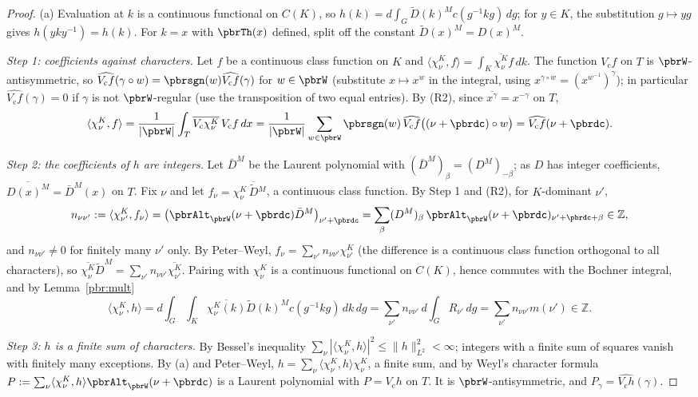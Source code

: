 \documentclass[10pt]{amsart}
\theoremstyle{definition}
\theoremstyle{remark}
\newcommand{\Z}{\mathbb Z}
\providecommand{\aubar}[1]{\overline{#1}}
\begin{document}
\begin{proof}
(a) Evaluation at $k$ is a continuous functional on $C(K)$, so $h(k)=d\int_G\widetilde D(k)^Mc(g^{-1}
kg)\,dg$; for $y\in K$, the substitution $g\mapsto yg$ gives $h(yky^{-1})=h(k)$. For $k=x$ with
$\pbrTh(x)$ defined, split off the constant $\widetilde D(x)^M=D(x)^M$.

\emph{Step 1: coefficients against characters.} Let $f$ be a continuous class function on $K$ and
$\langle\chi^K_\nu,f\rangle=\int_K\aubar{\chi^K_\nu}f\,dk$. The function $V_{\mathrm c}f$ on $T$ is
$\pbrW$-antisymmetric, so $\widehat{V_{\mathrm c}f}(\gamma\circ w)=\pbrsgn(w)\widehat{V_{\mathrm c}f}
(\gamma)$ for $w\in\pbrW$ (substitute $x\mapsto x^w$ in the integral, using
$x^{\gamma\circ w}=(x^{w^{-1}})^\gamma$); in particular $\widehat{V_{\mathrm c}f}(\gamma)=0$ if
$\gamma$ is not $\pbrW$-regular (use the transposition of two equal entries). By (R2), since
$\aubar{x^\gamma}=x^{-\gamma}$ on $T$,
\[
\langle\chi^K_\nu,f\rangle=\frac1{|\pbrW|}\int_T\aubar{V_{\mathrm c}\chi^K_\nu}\,V_{\mathrm c}f\,dx
=\frac1{|\pbrW|}\sum_{w\in\pbrW}\pbrsgn(w)\,\widehat{V_{\mathrm c}f}\bigl((\nu+\pbrdc)\circ w\bigr)
=\widehat{V_{\mathrm c}f}(\nu+\pbrdc).
\]

\emph{Step 2: the coefficients of $h$ are integers.} Let $\bar D^M$ be the Laurent polynomial with
$(\bar D^M)_\beta=(D^M)_{-\beta}$; as $D$ has integer coefficients, $\aubar{D(x)^M}=\bar D^M(x)$ on
$T$. Fix $\nu$ and let $f_\nu=\chi^K_\nu\,\aubar{\widetilde D}{}^M$, a continuous class function. By
Step 1 and (R2), for $K$-dominant $\nu'$,
\begin{equation}\label{pbr:eq-n}
n_{\nu\nu'}:=\langle\chi^K_{\nu'},f_\nu\rangle=\bigl(\pbrAlt_{\pbrW}(\nu+\pbrdc)\bar D^M\bigr)_{\nu'+
\pbrdc}=\sum_\beta(D^M)_\beta\,\pbrAlt_{\pbrW}(\nu+\pbrdc)_{\nu'+\pbrdc+\beta}\in\Z,
\end{equation}
and $n_{\nu\nu'}\ne0$ for finitely many $\nu'$ only. By Peter--Weyl, $f_\nu=\sum_{\nu'}n_{\nu\nu'}
\chi^K_{\nu'}$ (the difference is a continuous class function orthogonal to all characters), so
$\aubar{\chi^K_\nu}\widetilde D^M=\sum_{\nu'}n_{\nu\nu'}\aubar{\chi^K_{\nu'}}$. Pairing with
$\chi^K_\nu$ is a continuous functional on $C(K)$, hence commutes with the Bochner integral, and by
Lemma~\ref{pbr:mult}
\[
\langle\chi^K_\nu,h\rangle=d\int_G\int_K\aubar{\chi^K_\nu(k)}\widetilde D(k)^Mc(g^{-1}kg)\,dk\,dg=
\sum_{\nu'}n_{\nu\nu'}\,d\int_GR_{\nu'}\,dg=\sum_{\nu'}n_{\nu\nu'}m(\nu')\in\Z .
\]

\emph{Step 3: $h$ is a finite sum of characters.} By Bessel's inequality $\sum_\nu|\langle\chi^K_\nu,h
\rangle|^2\le\|h\|_{L^2}^2<\infty$; integers with a finite sum of squares vanish with finitely many
exceptions. By (a) and Peter--Weyl, $h=\sum_\nu\langle\chi^K_\nu,h\rangle\chi^K_\nu$, a finite sum, and
by Weyl's character formula $P:=\sum_\nu\langle\chi^K_\nu,h\rangle\pbrAlt_{\pbrW}(\nu+\pbrdc)$ is a
Laurent polynomial with $P=V_{\mathrm c}h$ on $T$. It is $\pbrW$-antisymmetric, and $P_\gamma=
\widehat{V_{\mathrm c}h}(\gamma)$.


\end{proof}
\end{document}
